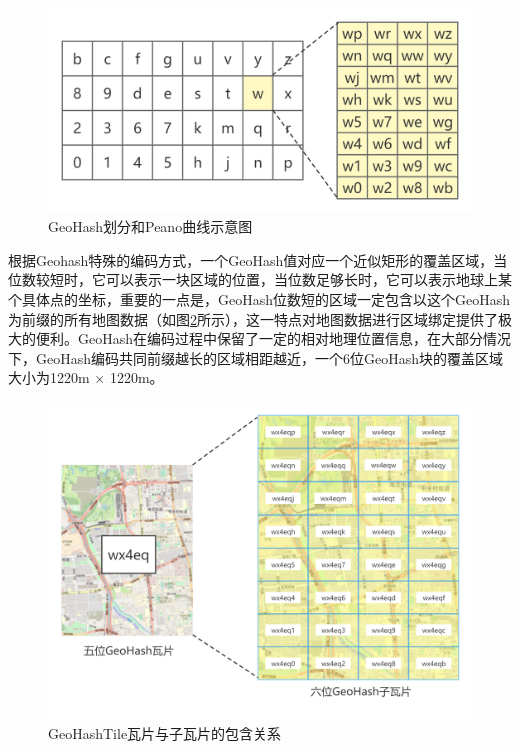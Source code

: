\begin{figure}[h]
  \centering
  \includegraphics[width=1.0\textwidth]{figures/peano}
  \caption{GeoHash划分和Peano曲线示意图}\label{fig:peano}
\end{figure}

根据Geohash特殊的编码方式，一个GeoHash值对应一个近似矩形的覆盖区域，当位数较短时，它可以表示一块区域的位置，当位数足够长时，它可以表示地球上某个具体点的坐标，重要的一点是，GeoHash位数短的区域一定包含以这个GeoHash为前缀的所有地图数据（如图\ref{fig:fatherAndSon}所示），这一特点对地图数据进行区域绑定提供了极大的便利。GeoHash在编码过程中保留了一定的相对地理位置信息，在大部分情况下，GeoHash编码共同前缀越长的区域相距越近，一个6位GeoHash块的覆盖区域大小为1220m × 1220m。

\begin{figure}[h]
  \centering
  \includegraphics[width=1.0\textwidth]{figures/瓦片与子瓦片}
  \caption{GeoHashTile瓦片与子瓦片的包含关系}\label{fig:fatherAndSon}
\end{figure}

